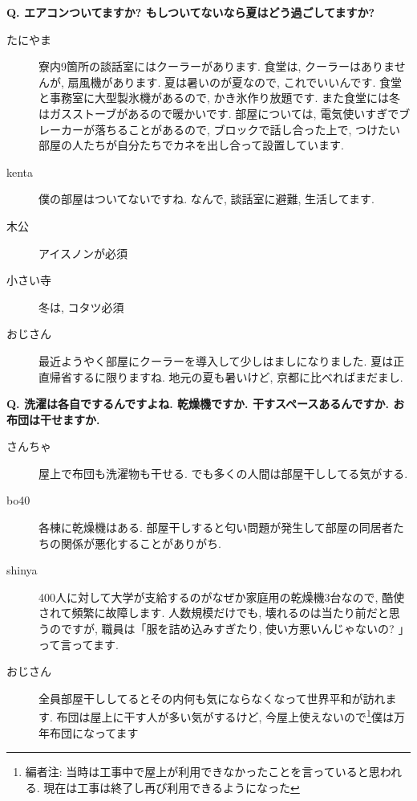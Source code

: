 \documentclass[10pt,b5jsbook,dvips,dvipdfmx,openany]{jsbook}
\theoremstyle{definition}
\begin{document}
		\begin{tcolorbox}
		\textbf{Q. エアコンついてますか? もしついてないなら夏はどう過ごしてますか?}
		\end{tcolorbox}
		\begin{description}
		\item[たにやま]
		寮内9箇所の談話室にはクーラーがあります. 食堂は, クーラーはありませんが, 扇風機があります. 夏は暑いのが夏なので, これでいいんです. 食堂と事務室に大型製氷機があるので, かき氷作り放題です. また食堂には冬はガスストーブがあるので暖かいです. 部屋については, 電気使いすぎでブレーカーが落ちることがあるので, ブロックで話し合った上で, つけたい部屋の人たちが自分たちでカネを出し合って設置しています.
		\item[kenta]
		僕の部屋はついてないですね. なんで, 談話室に避難, 生活してます.
		\item[木公]
		アイスノンが必須
		\item[小さい寺]
		冬は, コタツ必須
		\item[おじさん]
		最近ようやく部屋にクーラーを導入して少しはましになりました. 夏は正直帰省するに限りますね. 地元の夏も暑いけど, 京都に比べればまだまし.
		\end{description}

		\begin{tcolorbox}
		\textbf{Q. 洗濯は各自でするんですよね. 乾燥機ですか. 干すスペースあるんですか. お布団は干せますか. }
		\end{tcolorbox}
		\begin{description}
		\item[さんちゃ]屋上で布団も洗濯物も干せる. でも多くの人間は部屋干ししてる気がする.
		\item[bo40]各棟に乾燥機はある. 部屋干しすると匂い問題が発生して部屋の同居者たちの関係が悪化することがありがち.
		\item[shinya]
		400人に対して大学が支給するのがなぜか家庭用の乾燥機3台なので, 酷使されて頻繁に故障します. 人数規模だけでも, 壊れるのは当たり前だと思うのですが, 職員は「服を詰め込みすぎたり, 使い方悪いんじゃないの? 」って言ってます.
		\item[おじさん]
		全員部屋干ししてるとその内何も気にならなくなって世界平和が訪れます. 布団は屋上に干す人が多い気がするけど, 今屋上使えないので\footnote{編者注: 当時は工事中で屋上が利用できなかったことを言っていると思われる. 現在は工事は終了し再び利用できるようになった}僕は万年布団になってます
		\end{description}
\end{document}

